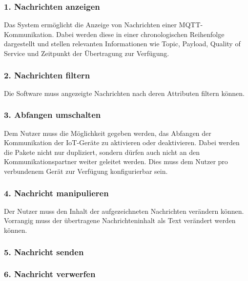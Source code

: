         \subsubsection{1. Nachrichten anzeigen}
        Das System ermöglicht die Anzeige von Nachrichten einer \ac{MQTT}-Kommunikation.
        Dabei werden diese in einer chronologischen Reihenfolge dargestellt und stellen relevanten Informationen wie Topic, Payload, Quality of Service und Zeitpunkt der Übertragung zur Verfügung.
        
        \subsubsection{2. Nachrichten filtern}
        Die Software muss angezeigte Nachrichten nach deren Attributen filtern können. 
        
        \subsubsection{3. Abfangen umschalten}
        Dem Nutzer muss die Möglichkeit gegeben werden, das Abfangen der  Kommunikation der \ac{IoT}-Geräte zu aktivieren oder deaktivieren.
        Dabei werden die Pakete nicht nur dupliziert, sondern dürfen auch nicht an den Kommunikationspartner weiter geleitet werden.
        Dies muss dem Nutzer pro verbundenem Gerät zur Verfügung konfigurierbar sein.
        
        \subsubsection{4. Nachricht manipulieren}
        Der Nutzer muss den Inhalt der aufgezeichneten Nachrichten verändern können.
        Vorrangig muss der übertragene Nachrichteninhalt als Text verändert werden können.
        
        \subsubsection{5. Nachricht senden}
        
        \subsubsection{6. Nachricht verwerfen}
        
        